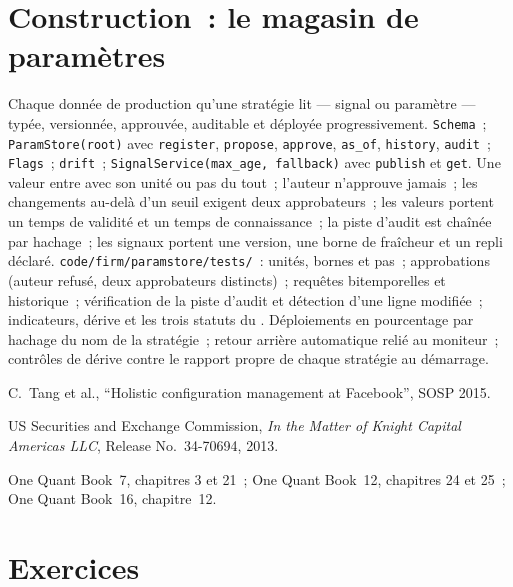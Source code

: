 \section{Construction~: le magasin de paramètres}\label{bld:pl:signal-serving-and-parameter-management:paramstore}

\begin{build}
 Chaque donnée de production qu'une stratégie lit --- signal ou paramètre --- typée, versionnée, approuvée, auditable et déployée
progressivement.
 \texttt{Schema}~; \texttt{ParamStore(root)} avec \texttt{register}, \texttt{propose}, \texttt{approve}, \texttt{as\_of},
\texttt{history}, \texttt{audit}~; \texttt{Flags}~; \texttt{drift}~; \texttt{SignalService(max\_age, fallback)} avec \texttt{publish} et
\texttt{get}.
 Une valeur entre avec son unité ou pas du tout~; l'auteur n'approuve jamais~; les changements au-delà d'un seuil exigent deux approbateurs~; les
valeurs portent un temps de validité et un temps de connaissance~; la piste d'audit est chaînée par hachage~; les signaux portent une version, une borne de fraîcheur et un repli déclaré.
 \texttt{code/firm/paramstore/tests/}~: unités, bornes et pas~; approbations (auteur refusé, deux approbateurs distincts)~;
requêtes bitemporelles et historique~; vérification de la piste d'audit et détection d'une ligne modifiée~; indicateurs, dérive et
les trois statuts du .
 Déploiements en pourcentage par hachage du nom de la stratégie~; retour arrière automatique relié au moniteur~; contrôles de dérive contre le
rapport propre de chaque stratégie au démarrage.
\end{build}

\begin{omsources}
\item C.~Tang et al., ``Holistic configuration management at Facebook'', SOSP 2015.
\item US Securities and Exchange Commission, \emph{In the Matter of Knight Capital Americas LLC}, Release No.\ 34-70694, 2013.
\item One Quant Book~7, chapitres 3 et 21~; One Quant Book~12, chapitres 24 et 25~; One Quant Book~16, chapitre~12.
\end{omsources}

\section{Exercices}

